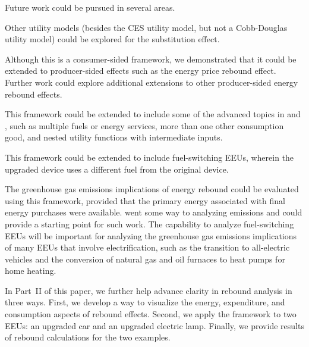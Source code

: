 \documentclass[12pt]{article}\usepackage[]{graphicx}\usepackage[]{xcolor}
\begin{document}
Future work could be pursued in several areas. 
%
\begin{enumerate*}[label={(\roman*)}]
	
  \item Other utility models
        (besides the CES utility model, but not a Cobb-Douglas utility model) 
        could be explored for the substitution effect.
  
  \item Although this is a consumer-sided framework,
        we demonstrated that it could be extended 
        to producer-sided effects such as the 
        energy price rebound effect. 
        Further work could explore additional
        extensions to other producer-sided 
        energy rebound effects.
  
  \item This framework could be extended to include 
        some of the advanced topics
        in \citet{Chan2015} and \citet{Wang2021}, 
        such as multiple fuels or energy services,
        more than one other consumption good, and
        nested utility functions with intermediate inputs.
        
  \item This framework could be extended to include fuel-switching EEUs,
        wherein the upgraded device uses a different fuel 
        from the original device.
        
  \item The greenhouse gas emissions implications of energy rebound
        could be evaluated using this framework,
        provided that the primary energy associated with final energy
        purchases were available. 
        \citet{Borenstein:2015aa} went some way to analyzing emissions
        and could provide a starting point for such work.
        The capability to analyze fuel-switching EEUs
        will be important for analyzing the greenhouse gas emissions
        implications of many EEUs that involve electrification, 
        such as the transition to all-electric vehicles and 
        the conversion of natural gas and oil furnaces to heat pumps 
        for home heating.
  
\end{enumerate*}

In Part~II of this paper,
we further help advance clarity in rebound analysis
in three ways. 
First, 
we develop a way to visualize 
the energy, expenditure, and consumption aspects
of rebound effects.
Second, we apply the framework to two EEUs:
an upgraded car and an upgraded electric lamp.
Finally, we provide results of rebound calculations for the two examples.
\end{document}
